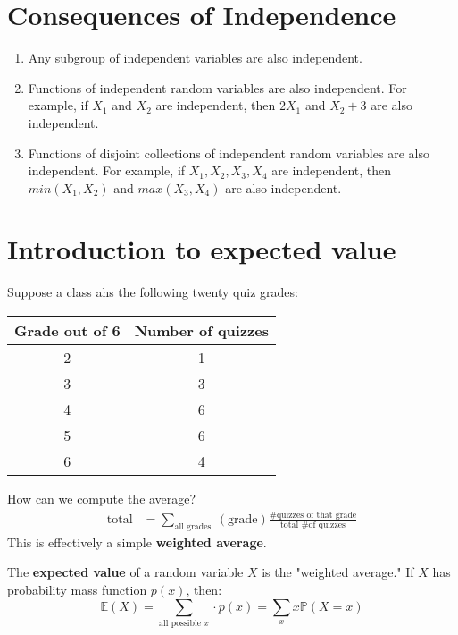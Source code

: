 \documentclass[titlepage, 12pt, leqno]{article}
\begin{document}
\pagebreak
\section{Consequences of Independence}
\begin{enumerate}
    \item Any subgroup of independent variables are also independent.
    \item Functions of independent random variables are also independent. For
        example, if $X_1$ and $X_2$ are independent, then $2X_1$ and $X_2 + 3$ 
        are also independent.
    \item Functions of disjoint collections of independent random variables are
        also independent. For example, if $X_1, X_2, X_3, X_4$ are independent,
        then $min(X_1, X_2)$ and $max(X_3, X_4)$ are also independent.
\end{enumerate}

\pagebreak
\section{Introduction to expected value}
Suppose a class ahs the following twenty quiz grades:
\begin{center}
\begin{tabular}{c|c}
    Grade out of 6 & Number of quizzes \\
    \hline
    2&1 \\
    3&3 \\
    4&6 \\
    5&6 \\
    6&4
\end{tabular}
\end{center}

How can we compute the average?
\begin{align*}
    \text{total} &= \sum_{ \text{all grades }}( \text{grade})
    \frac{ \text{\# quizzes of that grade}}{ \text{total \# of quizzes}}
\end{align*}
This is effectively a simple \textbf{weighted average}.

\begin{definition}
    The \textbf{expected value} of a random variable $X$ is the "weighted 
    average." If $X$ has probability mass function $p(x)$, then:
    \[
    \mathbb{E}(X) = \sum_{ \text{all possible }x} \cdot p(x) = 
    \sum_{x}x \mathbb{P}(X=x)
    \]
\end{definition}
\end{document}
